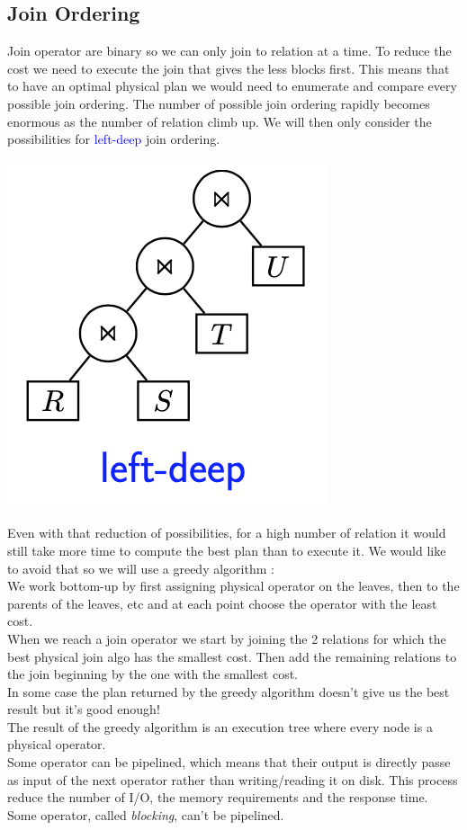 \documentclass[12pt,a4paper]{article}
\begin{document}
\subsection{Join Ordering}
Join operator are binary so we can only join to relation at a time. To reduce the cost we need to execute the join that gives the less blocks first. This means that to have an optimal physical plan we would need to enumerate and compare every possible join ordering. The number of possible join ordering rapidly becomes enormous as the number of relation climb up. We will then only consider the possibilities for \textcolor{blue}{left-deep} join ordering.
\begin{center}
\includegraphics[scale=0.5]{img/img59.png}
\end{center}
Even with that reduction of possibilities, for a high number of relation it would still take more time to compute the best plan than to execute it. We would like to avoid that so we will use a greedy algorithm :\\
We work bottom-up by first assigning physical operator on the leaves, then to the parents of the leaves, etc and at each point choose the operator with the least cost.\\
When we reach a join operator we start by joining the 2 relations for which the best physical join algo has the smallest cost. Then add the remaining relations to the join beginning by the one with the smallest cost.\\
In some case the plan returned by the greedy algorithm doesn't give us the best result but it's good enough!\\
The result of the greedy algorithm is an execution tree where every node is a physical operator.\\
Some operator can be pipelined, which means that their output is directly passe as input of the next operator rather than writing/reading it on disk. This process reduce the number of I/O, the memory requirements and the response time. Some operator, called \emph{blocking}, can't be pipelined.
\end{document}
